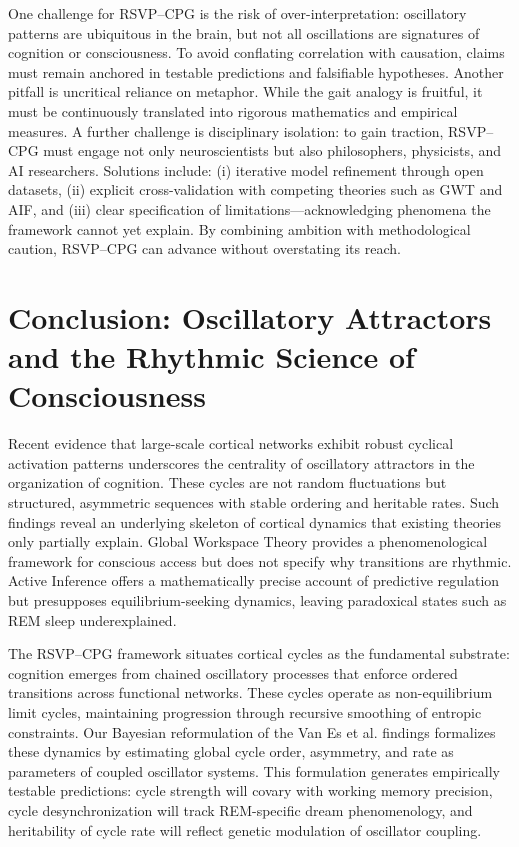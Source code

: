 \documentclass{article}
\begin{document}
One challenge for RSVP--CPG is the risk of over-interpretation: oscillatory patterns are ubiquitous in the brain, but not all oscillations are signatures of cognition or consciousness. To avoid conflating correlation with causation, claims must remain anchored in testable predictions and falsifiable hypotheses. Another pitfall is uncritical reliance on metaphor. While the gait analogy is fruitful, it must be continuously translated into rigorous mathematics and empirical measures. A further challenge is disciplinary isolation: to gain traction, RSVP--CPG must engage not only neuroscientists but also philosophers, physicists, and AI researchers. Solutions include: (i) iterative model refinement through open datasets, (ii) explicit cross-validation with competing theories such as GWT and AIF, and (iii) clear specification of limitations—acknowledging phenomena the framework cannot yet explain. By combining ambition with methodological caution, RSVP--CPG can advance without overstating its reach.


\section{Conclusion: Oscillatory Attractors and the Rhythmic Science of Consciousness}

Recent evidence that large-scale cortical networks exhibit robust cyclical activation patterns \citep{van2025cortical} underscores the centrality of oscillatory attractors in the organization of cognition. These cycles are not random fluctuations but structured, asymmetric sequences with stable ordering and heritable rates. Such findings reveal an underlying skeleton of cortical dynamics that existing theories only partially explain. Global Workspace Theory provides a phenomenological framework for conscious access but does not specify why transitions are rhythmic. Active Inference offers a mathematically precise account of predictive regulation but presupposes equilibrium-seeking dynamics, leaving paradoxical states such as REM sleep underexplained.

The RSVP--CPG framework situates cortical cycles as the fundamental substrate: cognition emerges from chained oscillatory processes that enforce ordered transitions across functional networks. These cycles operate as non-equilibrium limit cycles, maintaining progression through recursive smoothing of entropic constraints. Our Bayesian reformulation of the Van Es et al. findings formalizes these dynamics by estimating global cycle order, asymmetry, and rate as parameters of coupled oscillator systems. This formulation generates empirically testable predictions: cycle strength will covary with working memory precision, cycle desynchronization will track REM-specific dream phenomenology, and heritability of cycle rate will reflect genetic modulation of oscillator coupling.
\end{document}

